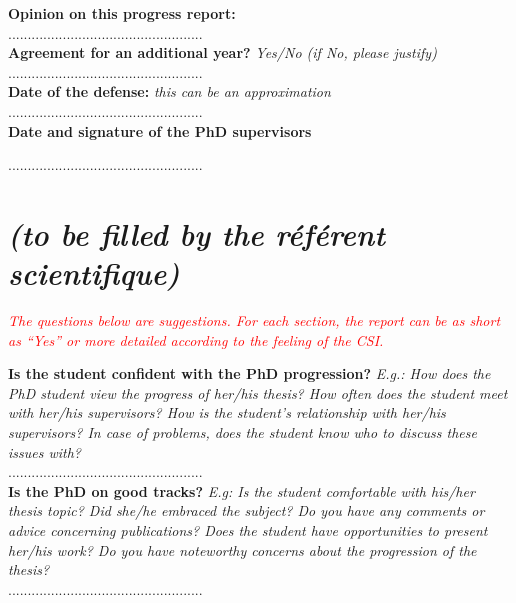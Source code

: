 \documentclass[12pt]{article}
\newcommand{\commentaire}[1]{\small\textit{#1}}
\begin{document}
\noindent\textbf{Opinion on this progress report:}\\
..................................................
\\

\noindent\textbf{Agreement for an additional year?}
\commentaire{%
  Yes/No (if No, please justify)\\}
..................................................
\\

\noindent\textbf{Date of the defense:}
\commentaire{%
  this can be an approximation\\}
..................................................
\\


\noindent\textbf{Date and signature of the PhD supervisors}

..................................................

\newpage
\section*{ \textit{\small (to be filled by the ré\-fé\-rent scientifique)}}

\commentaire{%
  \textcolor{red}{The questions below are suggestions. For each
    section, the report can be as short as “Yes” or more detailed
    according to the feeling of the CSI.\\}}

\noindent\textbf{Is the student confident with the PhD progression?}
\commentaire{%
  E.g.: How does the PhD student view the progress of
  her/his thesis? How often does the student meet with her/his
  supervisors? How is the student’s relationship with her/his
  supervisors? In case of problems, does the student know who to
  discuss these issues with?\\}
..................................................
\\

\noindent\textbf{Is the PhD on good tracks?}
\commentaire{%
  E.g: Is the student comfortable with his/her thesis topic? Did
  she/he embraced the subject? Do you have any comments or advice
  concerning publications? Does the student have opportunities to
  present her/his work? Do you have noteworthy concerns about the
  progression of the thesis?\\}
..................................................
\\
\end{document}
